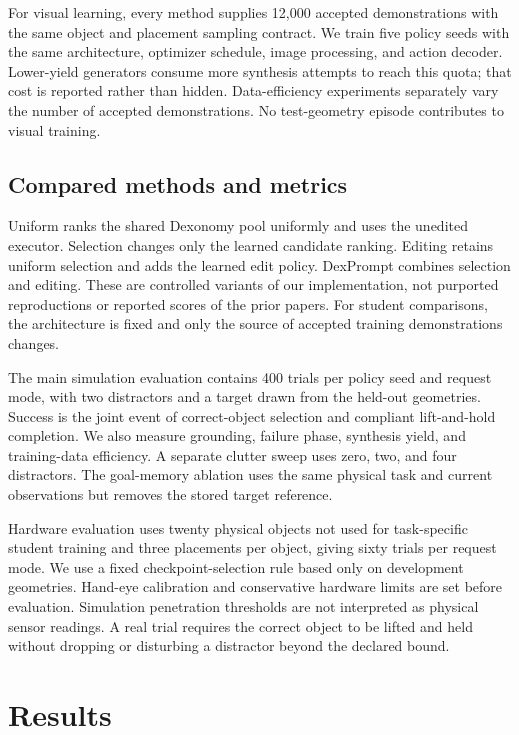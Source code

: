 \documentclass[letterpaper,10pt,conference]{ieeeconf}
\begin{document}
For visual learning, every method supplies 12,000 accepted demonstrations with the same object and placement sampling contract. We train five policy seeds with the same architecture, optimizer schedule, image processing, and action decoder. Lower-yield generators consume more synthesis attempts to reach this quota; that cost is reported rather than hidden. Data-efficiency experiments separately vary the number of accepted demonstrations. No test-geometry episode contributes to visual training.

\subsection{Compared methods and metrics}
Uniform ranks the shared Dexonomy pool uniformly and uses the unedited executor. Selection changes only the learned candidate ranking. Editing retains uniform selection and adds the learned edit policy. DexPrompt combines selection and editing. These are controlled variants of our implementation, not purported reproductions or reported scores of the prior papers. For student comparisons, the architecture is fixed and only the source of accepted training demonstrations changes.

The main simulation evaluation contains 400 trials per policy seed and request mode, with two distractors and a target drawn from the held-out geometries. Success is the joint event of correct-object selection and compliant lift-and-hold completion. We also measure grounding, failure phase, synthesis yield, and training-data efficiency. A separate clutter sweep uses zero, two, and four distractors. The goal-memory ablation uses the same physical task and current observations but removes the stored target reference.

Hardware evaluation uses twenty physical objects not used for task-specific student training and three placements per object, giving sixty trials per request mode. We use a fixed checkpoint-selection rule based only on development geometries. Hand-eye calibration and conservative hardware limits are set before evaluation. Simulation penetration thresholds are not interpreted as physical sensor readings. A real trial requires the correct object to be lifted and held without dropping or disturbing a distractor beyond the declared bound.

\section{Results}
\end{document}

